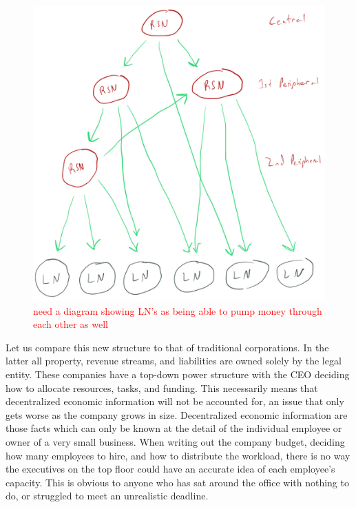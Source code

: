 \documentclass{article}[10pt]
\begin{document}
\begin{figure}[!ht]
    \centering
    \includegraphics[width=\textwidth]{figures/IMG_680F7D487817-1.pdf}
    \caption{\textcolor{red}{need a diagram showing LN's as being able to pump money through each other as well}}
    \label{fig:funnelUp}
\end{figure}

Let us compare this new structure to that of traditional corporations.
In the latter all property, revenue streams, and liabilities are owned solely by the legal entity.
These companies have a top-down power structure with the CEO deciding how to allocate resources, tasks, and funding.
This necessarily means that decentralized economic information will not be accounted for, an issue that only gets worse as the company grows in size.
Decentralized economic information are those facts which can only be known at the detail of the individual employee or owner of a very small business.\autocite{hayek1945use}
When writing out the company budget, deciding how many employees to hire, and how to distribute the workload, there is no way the executives on the top floor could have an accurate idea of each employee's capacity.
This is obvious to anyone who has sat around the office with nothing to do, or struggled to meet an unrealistic deadline.\par
\end{document}
